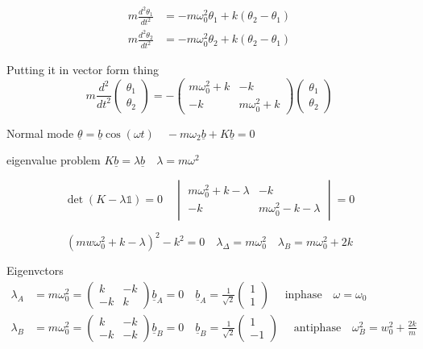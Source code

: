 \documentclass{article}
\begin{document}
\begin{align*}
    m \frac{d^{2}\theta_{1}}{dt^{2}} &= -m\omega_{0}^{2}\theta_{1} + k(\theta_{2} - \theta_{1}) \\
    m \frac{d^{2}\theta_{2}}{dt^{2}} &= -m\omega_{0}^{2}\theta_{2} + k(\theta_{2} - \theta_{1})
\end{align*}

Putting it in vector form thing
\[m \frac{d^{2}}{dt^{2}}\begin{pmatrix}
    \theta_{1} \\
    \theta_{2}
\end{pmatrix} = - \begin{pmatrix}
m\omega^{2}_{0} + k & -k \\
-k & m\omega_{0}^{2} + k
\end{pmatrix} \begin{pmatrix}
    \theta_{1} \\
    \theta_{2}
\end{pmatrix}\]

Normal mode $\underline{\theta} = \underline{b}\cos(\omega t) \quad -m\omega_{2} \underline{b} + K\underline{b} = 0$

eigenvalue problem $K\underline{b} = \lambda \underline{b} \quad \lambda = m\omega^{2}$

\[\det(K - \lambda \mathbb{1}) = 0 \quad \begin{vmatrix}
    m\omega_{0}^{2} + k - \lambda & -k \\
    -k & m\omega_{0}^{2} - k - \lambda
\end{vmatrix} = 0\]

\[(mw\omega^{2}_{0} + k - \lambda)^{2} - k^{2} = 0 \quad \lambda_{\Delta} = m\omega_{0}^{2} \quad \lambda_{B} = m\omega^{2}_{0} + 2k\]

Eigenvctors
\begin{align*}
    \lambda_{A} &= m\omega^{2}_{0} = \begin{pmatrix}
    k & -k\\
    -k & k
\end{pmatrix} \underline{b}_{A} = 0 \quad \underline{b}_{A} = \frac{1}{\sqrt{2}}\begin{pmatrix}
    1\\
    1
\end{pmatrix} \quad \text{ inphase} \quad \omega = \omega_{0} \\
        \lambda_{B} &= m\omega^{2}_{0} = \begin{pmatrix}
    k & -k\\
    -k & -k
\end{pmatrix} \underline{b}_{B} = 0 \quad \underline{b}_{B} = \frac{1}{\sqrt{2}}\begin{pmatrix}
    1\\
    -1
\end{pmatrix} \quad \text{ antiphase} \quad \omega_{B}^{2} = w_{0}^{2} + \frac{2k}{m}
\end{align*}
\end{document}
